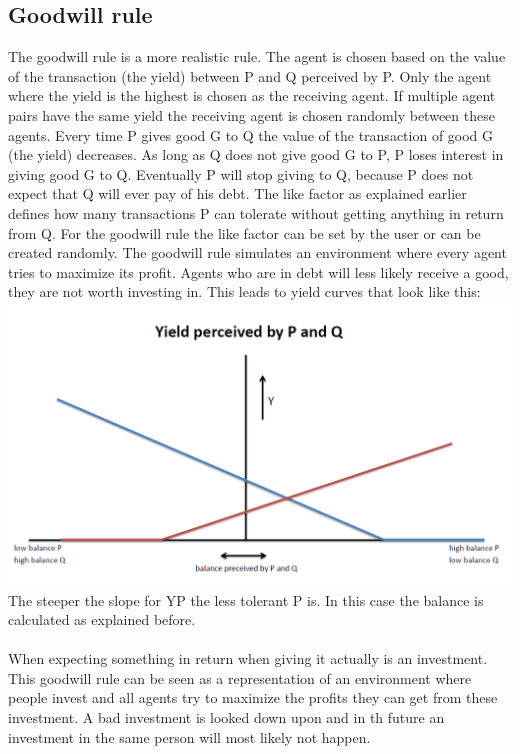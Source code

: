 \documentclass[twoside,openright]{uva-bachelor-thesis}
\begin{document}
\subsection{Goodwill rule}
The goodwill rule is a more realistic rule. The agent is chosen based on the value of the transaction (the yield) between P and Q perceived by P. Only the agent where the yield is the highest is chosen as the receiving agent. If multiple agent pairs have the same yield the receiving agent is chosen randomly between these agents. Every time P gives good G to Q the value of the transaction of good G (the yield) decreases. As long as Q does not give good G to P, P loses interest in giving good G to Q. Eventually P will stop giving to Q, because P does not expect that Q will ever pay of his debt. The like factor as explained earlier defines how many transactions P can tolerate without getting anything in return from Q. For the goodwill rule the like factor can be set by the user or can be created randomly. The goodwill rule simulates an environment where every agent tries to maximize its profit. Agents who are in debt will less likely receive a good, they are not worth investing in.
This leads to yield curves that look like this: \\
\includegraphics[scale=0.4]{YieldCurves/yieldcurve_PQ} \\
The steeper the slope for YP the less tolerant P is. In this case the balance is calculated as explained before.
\\
\\
When expecting something in return when giving it actually is an investment. This goodwill rule can be seen as a representation of an environment where people invest and all agents try to maximize the profits they can get from these investment. A bad investment is looked down upon and in th future an investment in the same person will most likely not happen.
\end{document}
